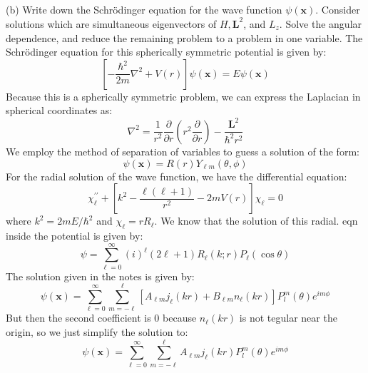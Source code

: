 \documentclass[12pt]{article}
\begin{document}
\subsection{}
(b) Write down the Schrödinger equation for the wave function $\psi(\mathbf{x})$. Consider solutions which are simultaneous eigenvectors of $H, \mathbf{L}^{2}$, and $L_{z}$. Solve the angular dependence, and reduce the remaining problem to a problem in one variable.
The Schrödinger equation for this spherically symmetric potential is given by:
\begin{equation}
\left[-\frac{\hbar^{2}}{2 m} \nabla^{2}+V(r)\right] \psi(\mathbf{x})=E \psi(\mathbf{x})
\end{equation}
Because this is a spherically symmetric problem, we can express the Laplacian in spherical coordinates as:
\begin{equation}
\nabla^{2}=\frac{1}{r^{2}} \frac{\partial}{\partial r}\left(r^{2} \frac{\partial}{\partial r}\right)-\frac{\mathbf{L}^{2}}{\hbar^{2} r^{2}}
\end{equation}
We employ the method of separation of variables to guess a solution of the form:
\begin{equation}
\psi(\mathbf{x})=R(r)Y_{\ell m}(\theta, \phi)
\end{equation}
For the radial solution of the wave function, we have the differential equation:
\begin{equation}
\chi_{\ell}^{\prime \prime}+\left[k^2-\frac{\ell(\ell+1)}{r^2}-2 m V(r)\right] \chi_{\ell}=0
\end{equation}
where $k^2=2 m E / \hbar^2$ and $\chi_{\ell}=r R_{\ell}$. 
We know that the solution of this radial. eqn inside the potential is given by:
\begin{equation}
\psi=\sum_{\ell=0}^{\infty}(i)^{\ell}(2 \ell+1) R_{\ell}(k ; r) P_{\ell}(\cos \theta)
\end{equation}
The solution given in the notes is given by:
\begin{equation}
\psi(\mathbf{x})=\sum_{\ell=0}^{\infty} \sum_{m=-\ell}^{\ell}\left[A_{\ell m} j_{\ell}(k r)+B_{\ell m} n_{\ell}(k r)\right] P_l^m(\theta) e^{i m \phi}
\end{equation}
But then the second coefficient is 0 because $n_{\ell}(k r)$ is not tegular near the origin, so we just simplify the solution to:
\begin{equation}
\psi(\mathbf{x})=\sum_{\ell=0}^{\infty} \sum_{m=-\ell}^{\ell}A_{\ell m} j_{\ell}(k r) P_l^m(\theta) e^{i m \phi}
\end{equation}
\end{document}

